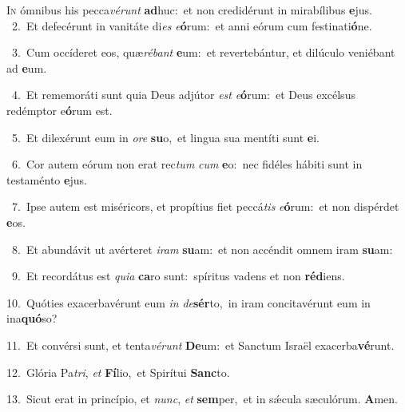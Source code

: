 \lettrine{\initial\textcolor{\initialcolor}{I}}{n} ómnibus his pecca\-\textit{vé}\-\textit{runt} \textbf{ad}\-huc:~\star et non credidérunt in mirabílibus \textbf{e}\-jus.\\
{\numbfont\textcolor{\numbcolor}{~2.}}~Et defecérunt in vanitáte di\textit{es} \textit{e}\-\textbf{ó}rum:~\star et anni eórum cum festinati\-\textbf{ó}\-ne.\par
{\numbfont\textcolor{\numbcolor}{~3.}}~Cum occíderet eos, quæ\-\textit{ré}\-\textit{bant} \textbf{e}\-um:~\star et revertebántur, et dilúculo veniébant ad \textbf{e}\-um.\par
{\numbfont\textcolor{\numbcolor}{~4.}}~Et rememoráti sunt quia Deus adjútor \textit{est} \textit{e}\-\textbf{ó}rum:~\star et Deus excélsus redémptor e\-\textbf{ó}\-rum est.\par
{\numbfont\textcolor{\numbcolor}{~5.}}~Et dilexérunt eum in \textit{o}\-\textit{re} \textbf{su}\-o,~\star et lingua sua mentíti sunt \textbf{e}\-i.\par
{\numbfont\textcolor{\numbcolor}{~6.}}~Cor autem eórum non erat rec\textit{tum} \textit{cum} \textbf{e}\-o:~\star nec fidéles hábiti sunt in testaménto \textbf{e}\-jus.\par
{\numbfont\textcolor{\numbcolor}{~7.}}~Ipse autem est miséricors, et propítius fiet peccá\textit{tis} \textit{e}\-\textbf{ó}rum:~\star et non dispérdet \textbf{e}\-os.\par
{\numbfont\textcolor{\numbcolor}{~8.}}~Et abundávit ut avérteret \textit{i}\-\textit{ram} \textbf{su}\-am:~\star et non accéndit omnem iram \textbf{su}\-am:\par
{\numbfont\textcolor{\numbcolor}{~9.}}~Et recordátus est \textit{qui}\-\textit{a} \textbf{ca}\-ro sunt:~\star spíritus vadens et non \textbf{réd}\-iens.\par
{\numbfont\textcolor{\numbcolor}{10.}}~Quóties exacerbavérunt eum \textit{in} \textit{de}\-\textbf{sér}to,~\star in iram concitavérunt eum in ina\-\textbf{quó}\-so?\par
{\numbfont\textcolor{\numbcolor}{11.}}~Et convérsi sunt, et tenta\-\textit{vé}\-\textit{runt} \textbf{De}\-um:~\star et Sanctum Israël exacerba\-\textbf{vé}\-runt.\par
{\numbfont\textcolor{\numbcolor}{12.}}~Glória Pa\-\textit{tri}\-, \textit{et} \textbf{Fí}\-lio,~\star et Spirítui \textbf{Sanc}\-to.\par
{\numbfont\textcolor{\numbcolor}{13.}}~Sicut erat in princípio, et \textit{nunc}\-, \textit{et} \textbf{sem}\-per,~\star et in sǽcula sæculórum. \textbf{A}\-men.\par
